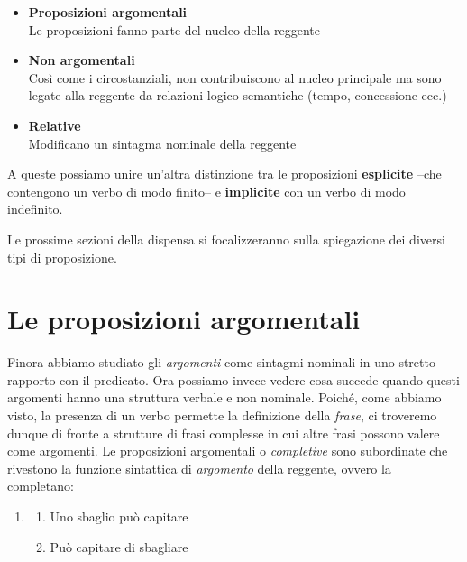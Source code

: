 \documentclass[
  a4paper,
  twoside,
  11pt,
  chapterprefix=false,
  bibliography=totocnumbered,
  listof=flat]{scrbook}
\providecommand{\tightlist}{%
  \setlength{\itemsep}{0pt}\setlength{\parskip}{0pt}}
\begin{document}
\begin{itemize}
\tightlist
\item
  \textbf{Proposizioni argomentali}\\
  Le proposizioni fanno parte del nucleo della reggente
\item
  \textbf{Non argomentali}\\
  Così come i circostanziali, non contribuiscono al nucleo principale ma sono legate alla reggente da relazioni logico-semantiche (tempo, concessione ecc.)
\item
  \textbf{Relative}\\
  Modificano un sintagma nominale della reggente
\end{itemize}

A queste possiamo unire un'altra distinzione tra le proposizioni \textbf{esplicite} --che contengono un verbo di modo finito-- e \textbf{implicite} con un verbo di modo indefinito.

Le prossime sezioni della dispensa si focalizzeranno sulla spiegazione dei diversi tipi di proposizione.

\hypertarget{le-proposizioni-argomentali}{%
\chapter{Le proposizioni argomentali}\label{le-proposizioni-argomentali}}

Finora abbiamo studiato gli \emph{argomenti} come sintagmi nominali in uno stretto rapporto con il predicato. Ora possiamo invece vedere cosa succede quando questi argomenti hanno una struttura verbale e non nominale. Poiché, come abbiamo visto, la presenza di un verbo permette la definizione della \emph{frase}, ci troveremo dunque di fronte a strutture di frasi complesse in cui altre frasi possono valere come argomenti.
Le proposizioni argomentali o \emph{completive} sono subordinate che rivestono la funzione sintattica di \emph{argomento} della reggente, ovvero la completano:

\begin{enumerate}
\def\labelenumi{(\arabic{enumi})}
\setcounter{enumi}{26}
\item
  \begin{enumerate}
  \def\labelenumii{\alph{enumii}.}
  \tightlist
  \item
    Uno sbaglio può capitare
  \item
    Può capitare di sbagliare
  \end{enumerate}
\end{enumerate}
\end{document}
